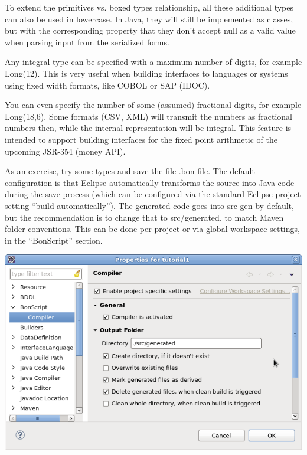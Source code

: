 \documentclass[11pt,a4paper,oneside]{article}
\begin{document}
To extend the primitives vs. boxed types relationship, all these additional types can also be used in lowercase. In Java, they will still be implemented as
classes, but with the corresponding property that they don't accept null as a valid value when parsing input from the serialized forms.

\vspace{2mm}

Any integral type can be specified with a maximum number of digits, for example {\ttfamily Long(12)}. This is very useful when
building interfaces to languages or systems using fixed width formats, like COBOL or SAP (IDOC).

You can even specify the number of some (assumed) fractional digits, for example {\ttfamily Long(18,6)}. Some formats (CSV, XML)
will transmit the numbers as fractional numbers then, while the internal representation will be integral. This feature is
intended to support building interfaces for the fixed point arithmetic of the upcoming JSR-354 (money API).


\vspace{2mm}

As an exercise, try some types and save the file {\ttfamily .bon} file. The default configuration is that Eclipse automatically transforms the source into
Java code during the save process (which can be configured via the standard Eclipse project setting ``build automatically''). The generated code goes into 
{\ttfamily src-gen} by default, but the recommendation is to change that to {\ttfamily src/generated}, to match Maven folder conventions.
This can be done per project or via global workspace settings, in the ``BonScript'' section.

\vspace{2mm}
\begin{center}
\includegraphics[scale=0.45]{images/tut1-003.png}
\end{center} 
\end{document}
